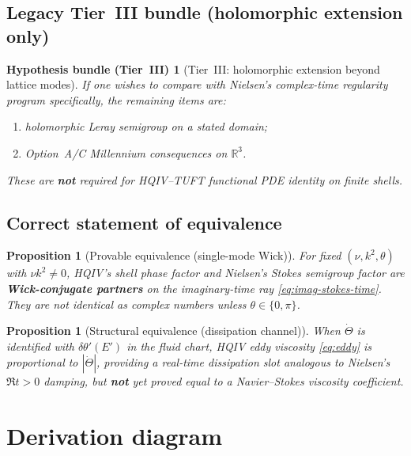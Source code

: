 \documentclass[11pt]{amsart}
\newtheorem{proposition}[theorem]{Proposition}
\newtheorem{hypothesis}[theorem]{Hypothesis bundle (Tier~III)}
\begin{document}
\subsection{Legacy Tier~III bundle (holomorphic extension only)}

\begin{hypothesis}[Tier~III: holomorphic extension beyond lattice modes]
\label{hyp:full-coinc}
If one wishes to compare with Nielsen's \emph{complex-time regularity} program specifically, the
remaining items are:
\begin{enumerate}[label=(H\arabic*),leftmargin=2em]
\item holomorphic Leray semigroup on a stated domain;
\item Option~A/C Millennium consequences on $\mathbb R^3$.
\end{enumerate}
These are \textbf{not} required for HQIV--TUFT functional PDE identity on finite shells.
\end{hypothesis}

\subsection{Correct statement of equivalence}

\begin{proposition}[Provable equivalence (single-mode Wick)]\label{prop:provable-eq}
For fixed $(\nu,k^2,\theta)$ with $\nu k^2\neq 0$, HQIV's shell phase factor and Nielsen's Stokes
semigroup factor are \textbf{Wick-conjugate partners} on the imaginary-time ray
\eqref{eq:imag-stokes-time}.
They are not identical as complex numbers unless $\theta\in\{0,\pi\}$.
\end{proposition}

\begin{proposition}[Structural equivalence (dissipation channel)]
When $\dot\Theta$ is identified with $\delta\theta'(E')$ in the fluid chart, HQIV eddy viscosity
\eqref{eq:eddy} is proportional to $|\dot\Theta|$, providing a real-time dissipation slot
analogous to Nielsen's $\Re t>0$ damping, but \textbf{not} yet proved equal to a Navier--Stokes
viscosity coefficient.
\end{proposition}

\section{Derivation diagram}
\label{sec:diagram}
\end{document}
